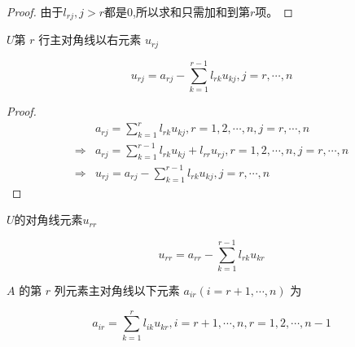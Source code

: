 \begin{proof}
    由于$l_{rj}, j > r$都是0,所以求和只需加和到第$r$项。
\end{proof}

\begin{corollary}
    $U$第 $ r $ 行主对角线以右元素 $ u_{r j} $

    \begin{equation} u_{r j}=a_{r j}-\sum_{k=1}^{r-1} l_{r k} u_{k j}, j = r, \cdots, n \end{equation}
\end{corollary}

\begin{proof}
    \begin{equation}\begin{aligned}
                        & a_{r j}=\sum_{k=1}^{r} l_{r k} u_{k j}, r=1,2, \cdots, n,j=r, \cdots, n                     \\
            \Rightarrow & a_{r j}=\sum_{k=1}^{r - 1} l_{r k} u_{k j} + l_{rr} u_{rj}, r=1,2, \cdots, n,j=r, \cdots, n \\
            \Rightarrow & u_{r j}=a_{r j}-\sum_{k=1}^{r-1} l_{r k} u_{k j}, j = r, \cdots, n
        \end{aligned}\end{equation}
\end{proof}


\begin{corollary}
    $U$的对角线元素$u_{r r}$

    \begin{equation} u_{r r}=a_{r r}-\sum_{k=1}^{r-1} l_{r k} u_{k r} \end{equation}
\end{corollary}


\begin{theorem}
    $ A $ 的第 $ r $ 列元素主对角线以下元素 $ a_{i r}(i=r+1, \cdots, n) $ 为

    \begin{equation}a_{i r}=\sum_{k=1}^{r} l_{i k} u_{k r}, i=r+1, \cdots, n, r=1,2, \cdots, n-1 \end{equation}
\end{theorem}

